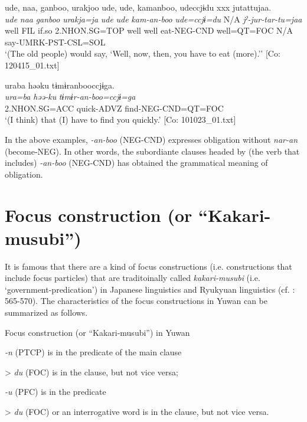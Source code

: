   \ex\relax[= (4-57)]

    
      \glll    ude,  naa,  ganboo,  urakjoo  ude,  ude,  kamanboo, udeccjɨdu  xxx  jutattujaa.\\
      \textit{ude}  \textit{naa}  \textit{ganboo}  \textit{urakja=ja}  \textit{ude}  \textit{ude}  \textit{kam-an-boo} \textit{ude=ccjɨ=du}  N/A  \textit{jˀ-jur-tar-tu=jaa}\\
      well  FIL  if.so  2.NHON.SG=TOP  well  well  eat-NEG-CND  well=QT=FOC  N/A  say-UMRK-PST-CSL=SOL\\
    \glt       ‘(The old people) would say, ‘Well, now, then, you have to eat (more).’’ [Co: 120415\_01.txt]

  \ex  
      \glll    uraba  həəku  tɨmɨranbooccjɨga.\\
      \textit{ura=ba}  \textit{həə-ku}  \textit{tɨmɨr-an-boo=ccjɨ=ga}\\
      2.NHON.SG=ACC  quick-ADVZ  find-NEG-CND=QT=FOC\\
      \glt       ‘(I think) that (I) have to find you quickly.’ [Co: 101023\_01.txt]
\z
\z

In the above examples, \textit{{}-an-boo} (NEG-CND) expresses obligation without \textit{nar-an} (become-NEG). In other words, the subordiante clauses headed by (the verb that includes) \textit{{}-an-boo} (NEG-CND) has obtained the grammatical meaning of obligation.

\section{Focus construction (or “Kakari-musubi”)}\label{sec:11.3}

It is famous that there are a kind of focus constructions (i.e. constructions that include focus particles) that are traditoinally called \textit{kakari-musubi} (i.e. ‘government-predication’) in Japanese linguistics and Ryukyuan linguistics (cf. \citealt{Shimoji2008}: 565-570). The characteristics of the focus constructions in Yuwan can be summarized as follows.

\ea\label{ex:11-14}   Focus construction (or “Kakari-musubi”) in Yuwan

\ea   \textit{{}-n} (PTCP) is in the predicate of the main clause

> \textit{du} (FOC) is in the clause, but not vice versa;

\ex   \textit{{}-u} (PFC) is in the predicate

> \textit{du} (FOC) or an interrogative word is in the clause, but not vice versa.
\z
\z

